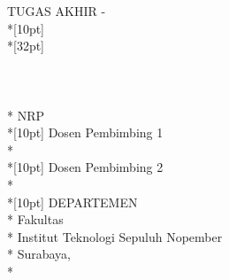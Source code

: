 \newpage

	\sffamily
	\thispagestyle{empty}
	\color{white}
	{ \noindent TUGAS AKHIR - \kode }\\*[10pt] 
	{\large\textbf{\MakeUppercase{\judul}}} \\*[32pt]
	\\
	\\
	\\
	\MakeUppercase{\penulis} \\*
	NRP \nrp \\*[10pt]
	Dosen Pembimbing 1 \\*
	\pembimbingSatu \\*[10pt]
	Dosen Pembimbing 2 \\*
	\pembimbingDua \\*[10pt]
	DEPARTEMEN \MakeUppercase{\jurusan} \\*
	Fakultas \fakultas \\*
	Institut Teknologi Sepuluh Nopember \\*
	Surabaya, \tahun \\*
	\rmfamily
	\normalsize
	\restoregeometry
	\color{black}
	\cleardoublepage
	
